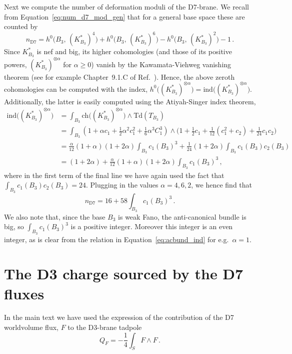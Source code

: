 \documentclass[a4paper,12pt]{article}
\numberwithin{equation}{section}
\newcommand{\w}{\ensuremath{\wedge}}
\newcommand{\be}{\begin{equation}}
\newcommand{\ee}{\end{equation}}
\newcommand{\fthb}{B_3}				%
\newcommand{\canb}[1]{K_{#1}}			%
\newcommand{\db}{S}					%
\newcommand{\tanb}[1]{T_{#1}}			%
\newcommand{\ind}{\mathrm{ind}}		%
\begin{document}
Next we compute the number of deformation moduli of the D7-brane. We recall from Equation~\eqref{eq:num_d7_mod_gen} that for a general base space these are counted by
\be
n_{\mathrm{D}7}=h^0\big(\fthb,\,(\canb{\fthb}^*)^{ 4}\big) + h^0\big(\fthb,\,(\canb{\fthb}^*)^{6}\big) - h^0\big(\fthb,\,(\canb{\fthb}^*)^{2}\big) - 1 \,.
\ee
Since $\canb{\fthb}^*$ is nef and big, its higher cohomologies (and those of its positive powers, $(\canb{\fthb}^*)^{\otimes \alpha}$ for $\alpha \geq 0$) vanish by the Kawamata-Viehweg vanishing theorem (see for example Chapter~9.1.C of Ref.~\cite{lazarsfeld2004positivity2}). Hence, the above zeroth cohomologies can be computed with the index, $h^0\big((\canb{\fthb}^*)^{\otimes \alpha}\big) = \ind\big( (\canb{\fthb}^*)^{\otimes \alpha} \big)$. Additionally, the latter is easily computed using the Atiyah-Singer index theorem,
\be
\begin{aligned}
\ind\big( (\canb{\fthb}^*)^{\otimes \alpha} \big)
& = \int_{\fthb} \mathrm{ch}\big( (\canb{\fthb}^*)^{\otimes \alpha} \big) \w \mathrm{Td}(\tanb{\fthb}) \\
&= \int_{\fthb} (1+\alpha c_1 + \tfrac{1}{2}\alpha^2 c_1^2+ \tfrac{1}{6}\alpha^3C_1^3) \w \big(1+\tfrac{1}{2}c_1+\tfrac{1}{12}(c_1^2+c_2)+\tfrac{1}{24}c_1c_2\big) \\
&=  \tfrac{\alpha}{12}(1+\alpha)(1+2\alpha)\int_{\fthb}c_1(\fthb)^3+\tfrac{1}{24}(1+2\alpha)\int_{\fthb}c_1(\fthb)c_2(\fthb) \\
&= (1+2\alpha) + \tfrac{\alpha}{12}(1+\alpha)(1+2\alpha)\int_{\fthb}c_1(\fthb)^3 \,,
\end{aligned}
\label{eq:acbund_ind}
\ee
where in the first term of the final line we have again used the fact that $\int_{\fthb} c_1(\fthb)c_2(\fthb) = 24$. Plugging in  the values $\alpha = 4,6,2$, we hence find that
\be
n_{\mathrm{D}7} = 16 + 58\int_{\fthb}c_1(\fthb)^3 \,.
\ee
We also note that, since the base $\fthb$ is weak Fano, the anti-canonical bundle is big, so $\int_{\fthb} c_1(\fthb)^3$ is a positive integer. Moreover this integer is an even integer, as is clear from the relation in Equation~\eqref{eq:acbund_ind} for e.g.\ $\alpha=1$.


\section{The D3 charge sourced by the D7 fluxes}
\label{app:tadpole}

In the main text we have used the expression of the contribution of the D7 worldvolume flux, $F$ to the D3-brane tadpole
\be
Q_F = - \frac{1}{4}\int_\db F \w F \,.
\ee
\end{document}
